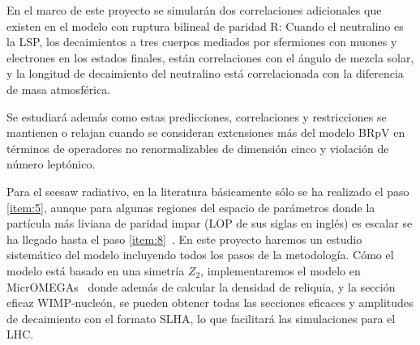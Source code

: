 \begin{brpvlhc}
  En el marco de este proyecto se simularán dos correlaciones
  adicionales que existen en el modelo con ruptura bilineal de paridad R:
  Cuando el neutralino es la LSP, los decaimientos a tres cuerpos
  mediados por sfermiones con muones y electrones en los estados
  finales, están correlaciones con el ángulo de mezcla solar, y la
  longitud de decaimiento del neutralino está correlacionada con la
  diferencia de masa atmosférica.
\end{brpvlhc}

\begin{bbrpvlhc}
   Se estudiará además como estas predicciones, correlaciones y
   restricciones se mantienen o relajan cuando se consideran
   extensiones más del modelo BRpV en términos de operadores no
   renormalizables de dimensión cinco y violación de número leptónico.  
\end{bbrpvlhc}

\begin{darkmatter}
  Para el seesaw radiativo, en la literatura básicamente sólo se ha
  realizado el paso \ref{item:5}, aunque para algunas regiones del
  espacio de parámetros donde la partícula más liviana de paridad
  impar (LOP de sus siglas en inglés) es escalar se ha llegado hasta
  el paso \ref{item:8}~\cite{Bergman:2007pm}. En este proyecto haremos un
  estudio sistemático del modelo incluyendo todos los pasos de la
  metodología. Cómo el modelo está basado en una simetría $Z_2$,
  implementaremos el modelo en MicrOMEGAs~\cite{Belanger:2010gh} donde
  además de calcular la densidad de reliquia, y la sección eficaz
  WIMP-nucleón, se pueden obtener todas las secciones eficaces y
  amplitudes de decaimiento con el formato SLHA, lo que facilitará las
  simulaciones para el LHC.
\end{darkmatter}




